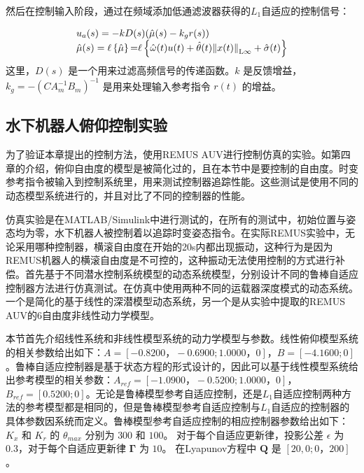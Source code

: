然后在控制输入阶段，通过在频域添加低通滤波器获得的$L_1$自适应的控制信号：

\begin{equation}
\begin{array}{l}
 {u_a}(s) =  - kD(s)(\hat \mu (s) - {k_g}r(s)) \\
 \hat \mu (s) = \ell \left\{ {\hat \mu } \right\}{\rm{ = }}\ell \left\{ {\hat \omega (t)u(t) + \hat \theta (t){{\left\| {x(t)} \right\|}_{{\rm{L}}\infty }} + \hat \sigma (t)} \right\} \\
 \end{array}
 \label{eq:chap5:59}
\end{equation}
这里，$D(s)$ 是一个用来过滤高频信号的传递函数。$k$ 是反馈增益，$k_g=-(CA_{m}^{-1}B_m)^{-1}$ 是用来处理输入参考指令 $r(t)$ 的增益。


\subsection{水下机器人俯仰控制实验 }

为了验证本章提出的控制方法，使用REMUS AUV进行控制仿真的实验。如第四章的介绍，俯仰自由度的模型是被简化过的，且在本节中是要控制的自由度。时变参考指令被输入到控制系统里，用来测试控制器追踪性能。这些测试是使用不同的动态模型系统进行的，并且对比了不同的控制器的性能。

仿真实验是在MATLAB/Simulink中进行测试的，在所有的测试中，初始位置与姿态均为零，水下机器人被控制着以追踪时变姿态指令。在实际REMUS实验中，无论采用哪种控制器，横滚自由度在开始的20s内都出现振动，这种行为是因为REMUS机器人的横滚自由度是不可控的，这种振动无法使用控制的方式进行补偿。首先基于不同潜水控制系统模型的动态系统模型，分别设计不同的鲁棒自适应控制器方法进行仿真测试。在仿真中使用两种不同的运载器深度模式的动态系统。 一个是简化的基于线性的深潜模型动态系统，另一个是从实验中提取的REMUS AUV的6自由度非线性动力学模型\cite{prestero2001development,prestero2001verification}。

本节首先介绍线性系统和非线性模型系统的动力学模型与参数。线性俯仰模型系统的相关参数给出如下：$ A= [-0.8200，-0.6900; 1.0000，0]$，$B = [ - 4.1600; 0]$ 。鲁棒自适应控制器是基于状态方程的形式设计的，因此可以基于线性模型系统给出参考模型的相关参数：$ A_ {ref} = [ - 1.0900，-0.5200; 1.0000，0]$，$ B_ {ref} = [0.5200;0]$。无论是鲁棒模型参考自适应控制，还是$L_1$自适应控制两种方法的参考模型都是相同的，但是鲁棒模型参考自适应控制与$L_1$自适应的控制器的具体参数因系统而定义。鲁棒模型参考自适应控制的相应控制器参数给出如下：$K_x$ 和 $K_r$ 的 $\theta_ {max}$ 分别为 $300$ 和 $100$。 对于每个自适应更新律，投影公差 $\epsilon$ 为 $0.3$，对于每个自适应更新律 $\bm{\Gamma}$ 为 $10$。 在Lyapunov方程中 $\bm {Q} $ 是 $[20,0; 0，200]$。


